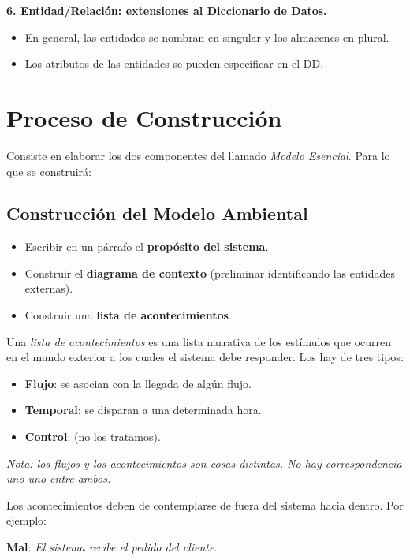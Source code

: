 \textbf{6. Entidad/Relación: extensiones al Diccionario de Datos.}

\begin{itemize}[noitemsep]
\item En general, las entidades se nombran en singular y los almacenes en plural.
\item Los atributos de las entidades se pueden especificar en el DD.
\end{itemize}

\section{Proceso de Construcción}

Consiste en elaborar los dos componentes del llamado \textit{Modelo Esencial}. Para lo que se construirá:

\subsection{Construcción del Modelo Ambiental}

\begin{itemize}[noitemsep]
\item Escribir en un párrafo el \textbf{propósito del sistema}.
\item Construir el \textbf{diagrama de contexto} (preliminar identificando las entidades externas).
\item Construir una \textbf{lista de acontecimientos}.
\end{itemize}

Una \textit{lista de acontecimientos} es una lista narrativa de los estímulos que ocurren en el mundo exterior a los cuales el sistema debe responder. Los hay de tres tipos:

\begin{itemize}[noitemsep]
\item \textbf{Flujo}: se asocian con la llegada de algún flujo.
\item \textbf{Temporal}: se disparan a una determinada hora.
\item \textbf{Control}: (no los tratamos).
\end{itemize}

\textit{Nota: los flujos y los acontecimientos son cosas distintas. No hay correspondencia uno-uno entre ambos.}

Los acontecimientos deben de contemplarse de fuera del sistema hacia dentro. Por ejemplo:

\textbf{Mal}: \textit{El sistema recibe el pedido del cliente}.

